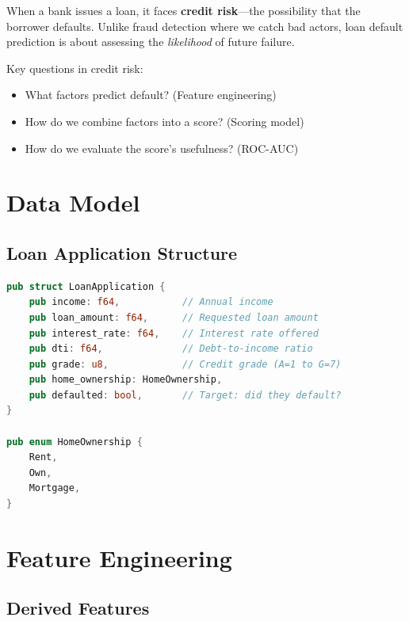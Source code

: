 When a bank issues a loan, it faces \textbf{credit risk}---the possibility that
the borrower defaults. Unlike fraud detection where we catch bad actors, loan
default prediction is about assessing the \emph{likelihood} of future failure.

Key questions in credit risk:
\begin{itemize}
    \item What factors predict default? (Feature engineering)
    \item How do we combine factors into a score? (Scoring model)
    \item How do we evaluate the score's usefulness? (ROC-AUC)
\end{itemize}

\section{Data Model}

\subsection{Loan Application Structure}

\begin{lstlisting}[language=Rust]
pub struct LoanApplication {
    pub income: f64,           // Annual income
    pub loan_amount: f64,      // Requested loan amount
    pub interest_rate: f64,    // Interest rate offered
    pub dti: f64,              // Debt-to-income ratio
    pub grade: u8,             // Credit grade (A=1 to G=7)
    pub home_ownership: HomeOwnership,
    pub defaulted: bool,       // Target: did they default?
}

pub enum HomeOwnership {
    Rent,
    Own,
    Mortgage,
}
\end{lstlisting}


\section{Feature Engineering}

\subsection{Derived Features}

